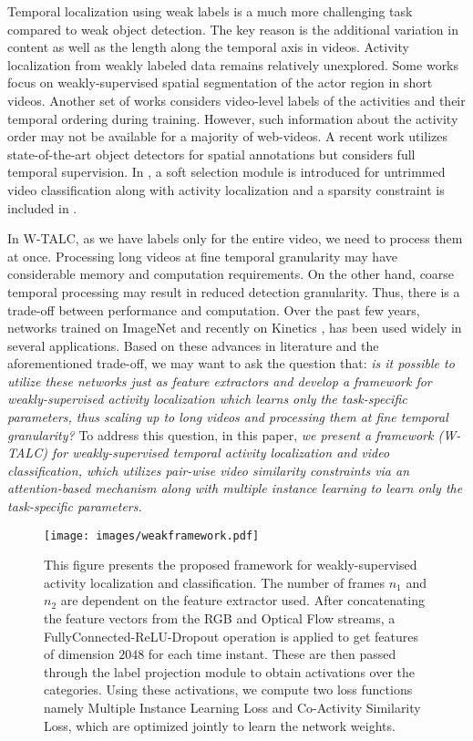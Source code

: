 \documentclass[runningheads]{llncs}
\begin{document}
Temporal localization using weak labels is a much more 
challenging task compared to weak object detection. The key reason is the additional variation in content as well as the length along the temporal axis in videos. 
Activity localization from weakly labeled data remains relatively unexplored. Some works \cite{siva2011weakly,yan2017weakly,sultani2016if} focus on weakly-supervised spatial segmentation of the actor region in short videos. Another set of works \cite{bojanowski2014weakly,kuehne2017weakly,richard2017weakly,huang2016connectionist} considers video-level labels of the activities and their temporal ordering during training. However, such information about the activity order may not be available for a majority of web-videos. A recent work \cite{weinzaepfel2017human} utilizes state-of-the-art object detectors for spatial annotations but considers full temporal supervision. In \cite{wang2017untrimmednets}, a soft selection module is introduced for untrimmed video classification along with activity localization and a sparsity constraint is included in \cite{nguyen2017weakly}.

In W-TALC, as we have labels only for the entire video, we need to process them at once. Processing long videos at fine temporal granularity may have considerable memory and computation requirements. On the other hand, coarse temporal processing may result in reduced detection granularity. Thus, there is a trade-off between performance and computation. Over the past few years, networks trained on ImageNet \cite{deng2009imagenet} and recently on Kinetics \cite{kay2017kinetics}, has been used widely in several applications. Based on these advances in literature and the aforementioned trade-off, we may want to ask the question that: \textit{is it possible to utilize these networks just as feature extractors and develop a framework for weakly-supervised activity localization which learns only the task-specific parameters, thus scaling up to long videos and processing them at fine temporal granularity?} To address this question, in this paper, \textit{we present a framework (W-TALC) for weakly-supervised temporal activity localization and video classification, which utilizes pair-wise video similarity constraints via an attention-based mechanism along with multiple instance learning to learn only the task-specific parameters.}

\begin{figure*}[t]
	\centering
	\texttt{[image: images/weakframework.pdf]}
	\caption{This figure presents the proposed framework for weakly-supervised activity localization and classification. The number of frames $n_1$ and $n_2$ are dependent on the feature extractor used. After concatenating the feature vectors from the RGB and Optical Flow streams, a FullyConnected-ReLU-Dropout operation is applied to get features of dimension $2048$ for each time instant. These are then passed through the label projection module to obtain activations over the categories.  Using these activations, we compute two loss functions namely Multiple Instance Learning Loss and Co-Activity Similarity Loss, which are optimized jointly to learn the network weights.}
	\label{framework}
\end{figure*}
\end{document}
